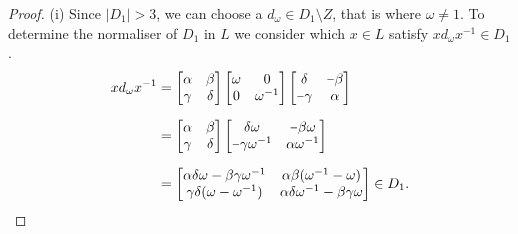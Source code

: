 \documentclass[a4paper , 11pt]{book}
\newcommand{\minus}{\scalebox{0.75}[1.0]{$-$}}
\theoremstyle{definition}
\theoremstyle{remark}
\begin{document}
\begin{proof} (i) Since $|D_1| > 3$, we can choose a $d_\omega \in D_1 \! \setminus \! Z$, that is where $\omega \neq 1$. To determine the normaliser of $D_1$ in $L$ we consider which $x \in L$ satisfy $x d_\omega x^{-1} \in D_1$.
\begin{align}\label{6.3proof3} xd_\omega x^{-1} &= \begin{bmatrix} \alpha & \beta \\ \gamma & \delta \end{bmatrix} \begin{bmatrix} \omega & 0 \\ 0 & \omega^{-1} \end{bmatrix} \begin{bmatrix} \delta & \minus \beta \\ \minus \gamma & \alpha \end{bmatrix} \nonumber \\[1.5ex]
&= \begin{bmatrix} \alpha & \beta \\ \gamma & \delta \end{bmatrix} \begin{bmatrix} \delta \omega & \minus \beta \omega \\ \minus \gamma \omega^{-1} & \alpha \omega^{-1} \end{bmatrix} \nonumber \\[1.5ex]
&= \begin{bmatrix} \alpha \delta \omega - \beta \gamma \omega^{-1} & \alpha \beta (\omega^{-1} - \omega) \\ \gamma \delta (\omega - \omega^{-1}) & \alpha \delta \omega^{-1} - \beta \gamma \omega \end{bmatrix} \in D_1.
\end{align}


\end{proof}
\end{document}
